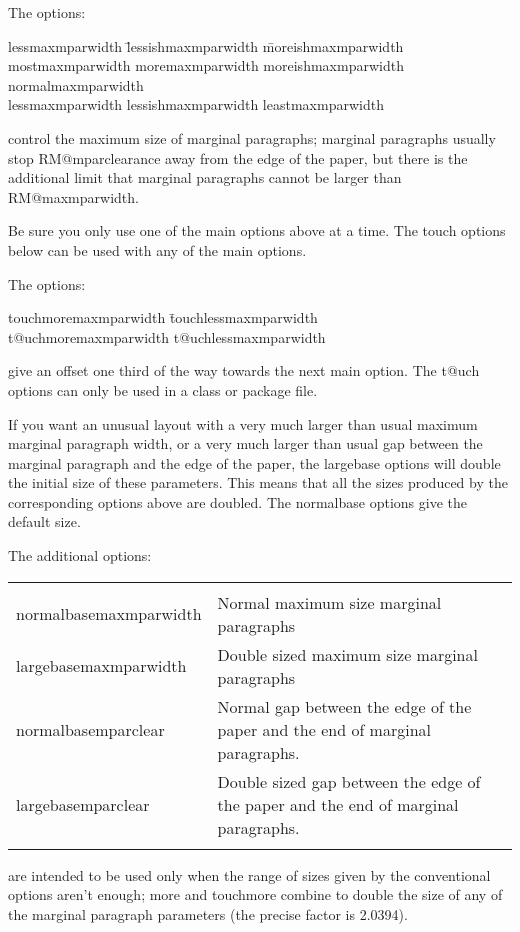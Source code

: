 \documentclass[11pt,loose,twoside,touchwider,longish,
                      noheaders,a4paper,notstdmargins]{report}
\DeclareRobustCommand*{\comname}[1]{{\ttfamily\makeatletter\bs #1\makeatother}}
\newcommand*{\optname}[1]{{\ttfamily #1}}
\begin{document}
The options:
\begin{tabbing}
\optname{lessmaxmparwidth} \= \optname{lessishmaxmparwidth} \=
\optname{moreishmaxmparwidth}\kill
\optname{mostmaxmparwidth} \> \optname{moremaxmparwidth} \>
\optname{moreishmaxmparwidth}\\
\optname{normalmaxmparwidth} \\
\optname{lessmaxmparwidth} \> \optname{lessishmaxmparwidth} \>
\optname{leastmaxmparwidth}
\end{tabbing}
control the maximum size of marginal paragraphs; marginal paragraphs
usually stop \comname{RM@mparclearance} away from the edge of the
paper, but there is the additional limit that marginal paragraphs
cannot be larger than {RM@maxmparwidth}.

Be sure you only use one of the main options above at a time.  The
\optname{touch} options below can be used with any of the main options.

The options:
\begin{tabbing}
\optname{touchmoremaxmparwidth} \= \optname{touchlessmaxmparwidth} \\
\optname{t@uchmoremaxmparwidth} \> \optname{t@uchlessmaxmparwidth}
\end{tabbing}
give an offset one third of the way towards the next main option.  The
\optname{t@uch} options can only be used in a class or package file.

If you want an unusual layout with a very much larger than usual
maximum marginal paragraph width, or a very much larger than usual gap
between the marginal paragraph and the edge of the paper, the
\optname{largebase} options will double the initial size of these
parameters.  This means that all the sizes produced by the
corresponding options above are doubled.  The \optname{normalbase}
options give the default size.

The additional options:

\noindent\begin{tabularx}{\textwidth}{lX}
&\\
\optname{normalbasemaxmparwidth} & Normal maximum size marginal
paragraphs \\
\optname{largebasemaxmparwidth} & Double sized maximum size marginal
paragraphs \\
\optname{normalbasemparclear} & Normal gap between the edge of the paper
and the end of marginal paragraphs. \\
\optname{largebasemparclear}& Double sized gap between the edge of the paper
and the end of marginal paragraphs. \\
&\\
\end{tabularx}
are intended to be used only when the range of sizes
given by the conventional options aren't enough; \optname{more} and
\optname{touchmore} combine to double the size of any of the marginal
paragraph parameters (the precise factor is 2.0394).
\end{document}

